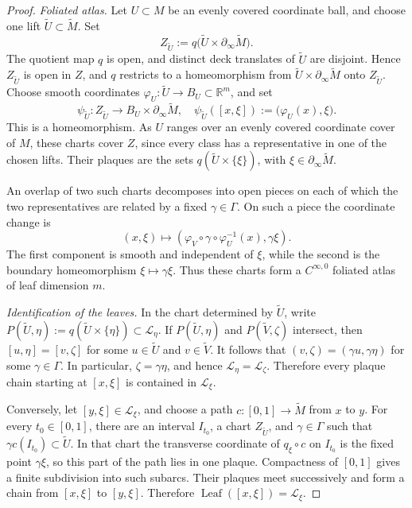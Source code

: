 \documentclass[12pt]{amsart}
\theoremstyle{definition}
\numberwithin{equation}{section}
\newcommand{\mc}{\mathcal}
\newcommand{\wti}{\widetilde}
\begin{document}
\begin{proof}
\emph{Foliated atlas.}
Let \(U\subset M\) be an evenly covered coordinate ball, and choose one
lift \(\wti U\subset\wti M\).  Set
\[
  Z_{\wti U}:=q\bigl(\wti U\times\partial_\infty\wti M\bigr).
\]
The quotient map \(q\) is open, and distinct deck translates of
\(\wti U\) are disjoint.  Hence \(Z_{\wti U}\) is open in \(Z\), and
\(q\) restricts to a homeomorphism from
\(\wti U\times\partial_\infty\wti M\) onto \(Z_{\wti U}\).  Choose
smooth coordinates
\(\varphi_U\colon\wti U\to B_U\subset\mathbb R^m\), and set
\[
  \psi_{\wti U}\colon Z_{\wti U}
  \longrightarrow B_U\times\partial_\infty\wti M,
  \quad
  \psi_{\wti U}([x,\xi])
  :=
  \bigl(\varphi_U(x),\xi\bigr).
\]
This is a homeomorphism.  As \(U\) ranges over an evenly covered
coordinate cover of \(M\), these charts cover \(Z\), since every class
has a representative in one of the chosen lifts.  Their plaques are the
sets \(q(\wti U\times\{\xi\})\), with
\(\xi\in\partial_\infty\wti M\).

An overlap of two such charts decomposes into open pieces on each of
which the two representatives are related by a fixed
\(\gamma\in\Gamma\).  On such a piece the coordinate change is
\[
  (x,\xi)
  \longmapsto
  \left(
    \varphi_V\circ\gamma\circ\varphi_U^{-1}(x),
    \gamma\xi
  \right).
\]
The first component is smooth and independent of \(\xi\), while the
second is the boundary homeomorphism
\(\xi\mapsto\gamma\xi\).  Thus these charts form a
\(C^{\infty,0}\) foliated atlas of leaf dimension \(m\).

\smallskip
\noindent\emph{Identification of the leaves.}
In the chart determined by \(\wti U\), write
\(P(\wti U,\eta):=q(\wti U\times\{\eta\})\subset\mc L_\eta\).
If \(P(\wti U,\eta)\) and \(P(\wti V,\zeta)\) intersect, then
\([u,\eta]=[v,\zeta]\) for some \(u\in\wti U\) and \(v\in\wti V\).
It follows that
\((v,\zeta)=(\gamma u,\gamma\eta)\) for some \(\gamma\in\Gamma\).
In particular, \(\zeta=\gamma\eta\), and hence
\(\mc L_\eta=\mc L_\zeta\).  Therefore every plaque chain starting at
\([x,\xi]\) is contained in \(\mc L_\xi\).

Conversely, let \([y,\xi]\in\mc L_\xi\), and choose a path
\(c\colon[0,1]\to\wti M\) from \(x\) to \(y\).  For every
\(t_0\in[0,1]\), there are an interval \(I_{t_0}\), a chart
\(Z_{\wti U}\), and \(\gamma\in\Gamma\) such that
\(\gamma c(I_{t_0})\subset\wti U\).  In that chart the transverse
coordinate of \(q_\xi\circ c\) on \(I_{t_0}\) is the fixed point
\(\gamma\xi\), so this part of the path lies in one plaque.  Compactness
of \([0,1]\) gives a finite subdivision into such subarcs.  Their plaques
meet successively and form a chain from \([x,\xi]\) to \([y,\xi]\).
Therefore
\(\operatorname{Leaf}([x,\xi])=\mc L_\xi\).


\end{proof}
\end{document}
